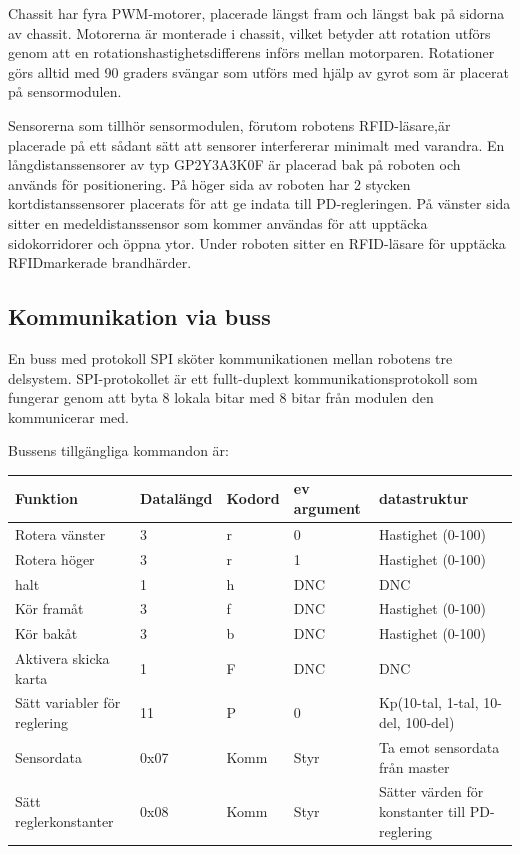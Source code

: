 \documentclass[a4paper,12pt,fleqn]{article}
\begin{document}
Chassit har fyra PWM-motorer, placerade längst fram och längst bak på sidorna av chassit. Motorerna är monterade i chassit, vilket betyder att rotation utförs genom att en rotationshastighetsdifferens införs mellan motorparen. Rotationer görs alltid med 90 graders svängar som utförs med hjälp av gyrot som är placerat på sensormodulen. 

Sensorerna som tillhör sensormodulen, förutom robotens RFID-läsare,är placerade på ett sådant sätt att sensorer interfererar minimalt med varandra. En långdistanssensorer av typ GP\-2Y\-3A\-3K\-0F är placerad bak på roboten och används för positionering. På höger sida av roboten har 2 stycken kortdistanssensorer placerats för att ge indata till PD-regleringen. På vänster sida sitter en medeldistanssensor som kommer användas för att upptäcka sidokorridorer och öppna ytor.
Under roboten sitter en RFID-läsare för upptäcka RFIDmarkerade brandhärder.

\subsection{Kommunikation via buss}
En buss med protokoll SPI sköter kommunikationen mellan robotens tre delsystem. SPI-protokollet är ett fullt-duplext kommunikationsprotokoll som fungerar genom att byta 8 lokala bitar med 8 bitar från modulen den kommunicerar med. 

Bussens tillgängliga kommandon är:

\begin{tabular}{| p{} | p{} | p{} | p{} | p{} |}
	\hline
	\rowcolor{listinggray}
	\textbf{Funktion} & \textbf{Datalängd} & \textbf{Kodord} & \textbf{ev argument} & \textbf{datastruktur} \\ \hline
	Rotera vänster & 3 & r & 0 & Hastighet (0-100) \\ \hline
	Rotera höger & 3 & r & 1 & Hastighet (0-100) \\ \hline
	halt & 1 & h & DNC & DNC \\ \hline
	Kör framåt & 3 & f & DNC & Hastighet (0-100) \\ \hline
	Kör bakåt & 3 & b & DNC & Hastighet (0-100) \\ \hline
	Aktivera skicka karta & 1 & F & DNC & DNC \\ \hline
	Sätt variabler för reglering & 11 & P & 0 & Kp(10-tal, 1-tal, 10-del, 100-del) \\ \hline
	Sensordata & 0x07 & Komm & Styr & Ta emot sensordata från master \\ \hline
	Sätt reglerkonstanter & 0x08 & Komm & Styr & Sätter värden för konstanter till PD-reglering \\ \hline
\end{tabular}
\end{document}
